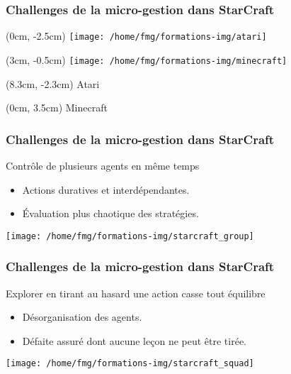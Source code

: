 \documentclass[smaller]{beamer}
\begin{document}

\begin{frame}
  \frametitle{Challenges de la micro-gestion dans StarCraft}

  \begin{textblock*}{8cm}(0cm, -2.5cm)
    \texttt{[image: /home/fmg/formations-img/atari]}
  \end{textblock*}

  \begin{textblock*}{8cm}(3cm, -0.5cm)
    \texttt{[image: /home/fmg/formations-img/minecraft]}
  \end{textblock*}

  \begin{textblock*}{2cm}(8.3cm, -2.3cm)
    {\huge Atari}
  \end{textblock*}

  \begin{textblock*}{2cm}(0cm, 3.5cm)
    {\huge Minecraft}
  \end{textblock*}
  
\end{frame}


\begin{frame}
  \frametitle{Challenges de la micro-gestion dans StarCraft}

  \begin{alertblock}{Contrôle de plusieurs agents en même temps}
    \begin{itemize}
    \item Actions duratives et interdépendantes.
    \item Évaluation plus chaotique des stratégies.
    \end{itemize}
  \end{alertblock}
  
  \centerline{\texttt{[image: /home/fmg/formations-img/starcraft\_group]}}  
    
\end{frame}


\begin{frame}
  \frametitle{Challenges de la micro-gestion dans StarCraft}

  \begin{alertblock}{Explorer en tirant au hasard une action casse tout équilibre}
    \begin{itemize}
    \item Désorganisation des agents.
    \item Défaite assuré dont aucune leçon ne peut être tirée.
    \end{itemize}
  \end{alertblock}

  \centerline{\texttt{[image: /home/fmg/formations-img/starcraft\_squad]}}  
    
\end{frame}
\end{document}
